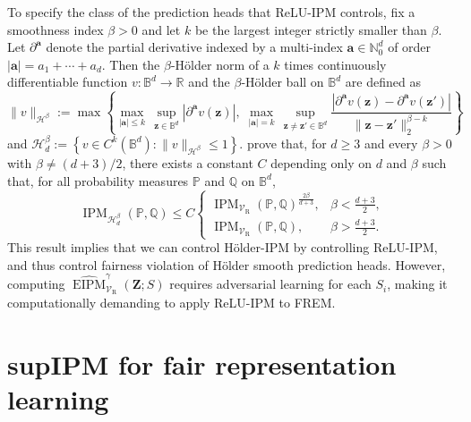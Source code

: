 \documentclass{article} %
\begin{document}
To specify the class of the prediction heads that ReLU-IPM controls, fix a smoothness index $\beta>0$ and let $k$ be the largest integer strictly smaller than $\beta$.  Let $\partial^{\mathbf{a}}$ denote the partial derivative indexed by a multi-index $\mathbf{a}\in\mathbb{N}_0^d$ of order $|\mathbf{a}|=a_1+\cdots+a_d$.  Then the $\beta$-H\"older norm of a $k$ times continuously differentiable function $v:\mathbb{B}^d\to\mathbb{R}$ and the $\beta$-H\"older ball on $\mathbb{B}^d$ are defined as
\begin{equation}
  \lVert v\rVert_{\mathcal{H}^{\beta}}
  :=\max\left\{
    \max_{|\mathbf{a}|\le k}\,\sup_{\mathbf{z}\in\mathbb{B}^d}
      \left|\partial^{\mathbf{a}}v(\mathbf{z})\right|,\;
    \max_{|\mathbf{a}|=k}\,\sup_{\mathbf{z}\ne\mathbf{z}'\in\mathbb{B}^d}
      \frac{\left|\partial^{\mathbf{a}}v(\mathbf{z})-\partial^{\mathbf{a}}v(\mathbf{z}')\right|}
           {\lVert\mathbf{z}-\mathbf{z}'\rVert_2^{\beta-k}}
  \right\}
  \label{eq:holder-ball}
\end{equation}
and $  \mathcal{H}^{\beta}_d
  :=\left\{v\in C^{k}(\mathbb{B}^d):\lVert v\rVert_{\mathcal{H}^{\beta}}\le 1\right\}.$
 \citet{park2026relu} prove that, for $d\ge3$ and every $\beta>0$ with $\beta\ne(d+3)/2$, there exists a constant $C$ depending only on $d$ and $\beta$ such that, for all probability measures $\mathbb{P}$ and $\mathbb{Q}$ on $\mathbb{B}^d$,
\begin{equation}
  \operatorname{IPM}_{\mathcal{H}^{\beta}_d}(\mathbb{P},\mathbb{Q})
  \le C
  \begin{cases}
    \operatorname{IPM}_{\mathcal{V}_{\mathrm{R}}}(\mathbb{P},\mathbb{Q})^{\frac{2\beta}{d+3}},
      & \beta<\frac{d+3}{2},\\[2mm]
    \operatorname{IPM}_{\mathcal{V}_{\mathrm{R}}}(\mathbb{P},\mathbb{Q}),
      & \beta>\frac{d+3}{2}.
  \end{cases}
  \label{eq:relu-holder}
\end{equation}
This result implies that we can control H\"older-IPM by controlling ReLU-IPM, and thus control fairness violation of H\"older smooth prediction heads. 
However, computing $\widehat{\operatorname{EIPM}}^{\gamma}_{\mathcal{V}_{\mathrm{R}}}(\mathbf{Z};S)$ requires  adversarial learning  for each $S_i$, making it computationally demanding to apply ReLU-IPM to FREM.

\section{supIPM for fair representation learning}
\label{sec:supipm}
\end{document}
